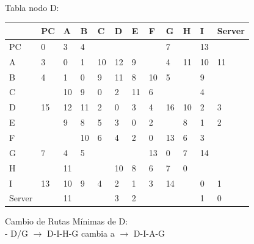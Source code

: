 \documentclass[a4paper]{article}
\begin{document}
\begin{table}[h]
Tabla nodo D:\\
\begin{tabular}{|l|l|l|l|l|l|l|l|l|l|l|l|}
\hline
       & PC & A  & B  & C  & D  & E  & F  & G  & H  & I  & Server \\ \hline
PC     & 0  & 3  & 4  &    &    &    &    & 7  &    & 13 &        \\ \hline
A      & 3  & 0  & 1  & 10 & 12 & 9  &    & 4  & 11 & 10 & 11     \\ \hline
B      & 4  & 1  & 0  & 9  & 11 & 8  & 10 & 5  &    & 9  &        \\ \hline
C      &    & 10 & 9  & 0  & 2  & 11 & 6  &    &    & 4  &        \\ \hline
D      & 15 & 12 & 11 & 2  & 0  & 3  & 4  & 16 & 10 & 2  & 3      \\ \hline
E      &    & 9  & 8  & 5  & 3  & 0  & 2  &    & 8  & 1  & 2      \\ \hline
F      &    &    & 10 & 6  & 4  & 2  & 0  & 13 & 6  & 3  &        \\ \hline
G      & 7  & 4  & 5  &    &    &    & 13 & 0  & 7  & 14 &        \\ \hline
H      &    & 11 &    &    & 10 & 8  & 6  & 7  & 0  &    &        \\ \hline
I      & 13 & 10 & 9  & 4  & 2  & 1  & 3  & 14 &    & 0  & 1      \\ \hline
Server &    & 11 &    &    & 3  & 2  &    &    &    & 1  & 0      \\ \hline
\end{tabular}

Cambio de Rutas Mínimas de D:\\
-	D/G  $\rightarrow$  D-I-H-G  cambia a $\rightarrow$  D-I-A-G\\

\end{table}
\clearpage
\end{document}
